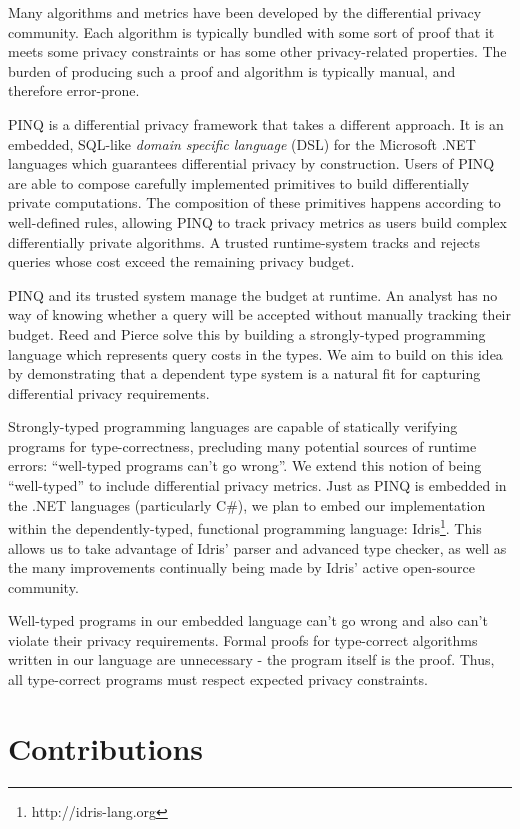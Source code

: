 \documentclass[12pt]{report}
\begin{document}
Many algorithms and metrics have been developed by the differential privacy community.
Each algorithm is typically bundled with some sort of proof that it meets some privacy constraints or has some other privacy-related properties.
The burden of producing such a proof and algorithm is typically manual, and therefore error-prone.

PINQ is a differential privacy framework that takes a different approach\cite{conf/sigmod/McSherry09}.
It is an embedded, SQL-like \textit{domain specific language} (DSL) for the Microsoft .NET languages which guarantees differential privacy by construction.
Users of PINQ are able to compose carefully implemented primitives to build differentially private computations.
The composition of these primitives happens according to well-defined rules, allowing PINQ to track privacy metrics as users build complex differentially private algorithms.
A trusted runtime-system tracks and rejects queries whose cost exceed the remaining privacy budget.

PINQ and its trusted system manage the budget at runtime.
An analyst has no way of knowing whether a query will be accepted without manually tracking their budget.
Reed and Pierce solve this by building a strongly-typed programming language which represents query costs in the types\cite{conf/icfp/ReedP10}.
We aim to build on this idea by demonstrating that a dependent type system is a natural fit for capturing differential privacy requirements.

Strongly-typed programming languages are capable of statically verifying programs for type-correctness, precluding many potential sources of runtime errors: ``well-typed programs can't go wrong''.
We extend this notion of being ``well-typed'' to include differential privacy metrics.
Just as PINQ is embedded in the .NET languages (particularly C\#), we plan to embed our implementation within the dependently-typed, functional programming language: Idris\footnote{http://idris-lang.org}.
This allows us to take advantage of Idris' parser and advanced type checker, as well as the many improvements continually being made by Idris' active open-source community.

Well-typed programs in our embedded language can't go wrong and also can't violate their privacy requirements.
Formal proofs for type-correct algorithms written in our language are unnecessary - the program itself is the proof.
Thus, all type-correct programs must respect expected privacy constraints.

\section{Contributions}
\end{document}
